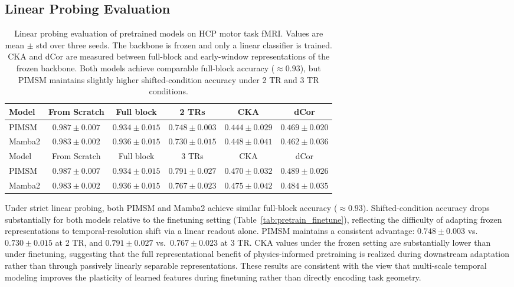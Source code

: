 \documentclass{article}
\begin{document}
\subsection{Linear Probing Evaluation}

\begin{table}[htbp]
\centering
\footnotesize
\begin{tabular}{lccccc}
\toprule
Model & From Scratch & Full block & 2 TRs & CKA & dCor \\
\midrule
PIMSM & $0.987 \pm 0.007$ & $0.934 \pm 0.015$ & $\mathbf{0.748 \pm 0.003}$ & $0.444 \pm 0.029$ & $\mathbf{0.469 \pm 0.020}$ \\
Mamba2 & $0.983 \pm 0.002$ & $\mathbf{0.936 \pm 0.015}$ & $0.730 \pm 0.015$ & $\mathbf{0.448 \pm 0.041}$ & $0.462 \pm 0.036$ \\
\midrule
Model & From Scratch & Full block & 3 TRs & CKA & dCor \\
\midrule
PIMSM & $0.987 \pm 0.007$ & $0.934 \pm 0.015$ & $\mathbf{0.791 \pm 0.027}$ & $0.470 \pm 0.032$ & $\mathbf{0.489 \pm 0.026}$ \\
Mamba2 & $0.983 \pm 0.002$ & $\mathbf{0.936 \pm 0.015}$ & $0.767 \pm 0.023$ & $\mathbf{0.475 \pm 0.042}$ & $0.484 \pm 0.035$ \\
\bottomrule
\end{tabular}
\caption{
Linear probing evaluation of pretrained models on HCP motor task fMRI.
Values are mean $\pm$ std over three seeds.
The backbone is frozen and only a linear classifier is trained.
CKA and dCor are measured between full-block and early-window representations of the frozen backbone.
Both models achieve comparable full-block accuracy ($\approx 0.93$), but PIMSM maintains slightly higher shifted-condition accuracy under 2 TR and 3 TR conditions.
}
\label{tab:linear_probe}
\end{table}

Under strict linear probing, both PIMSM and Mamba2 achieve similar full-block accuracy ($\approx 0.93$).
Shifted-condition accuracy drops substantially for both models relative to the finetuning setting (Table~\ref{tab:pretrain_finetune}), reflecting the difficulty of adapting frozen representations to temporal-resolution shift via a linear readout alone.
PIMSM maintains a consistent advantage: $0.748 \pm 0.003$ vs.\ $0.730 \pm 0.015$ at 2 TR, and $0.791 \pm 0.027$ vs.\ $0.767 \pm 0.023$ at 3 TR.
CKA values under the frozen setting are substantially lower than under finetuning, suggesting that the full representational benefit of physics-informed pretraining is realized during downstream adaptation rather than through passively linearly separable representations.
These results are consistent with the view that multi-scale temporal modeling improves the plasticity of learned features during finetuning rather than directly encoding task geometry.
\end{document}
